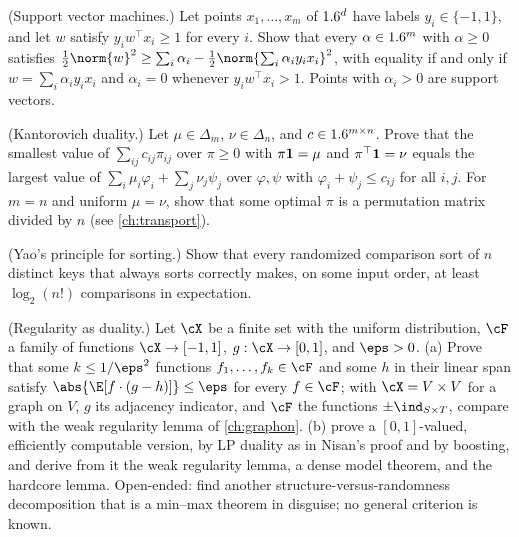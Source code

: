 \begin{refsection}
\begin{exercises}
\item \transfer (Support vector machines.) Let points $x_1,\dots,x_m$ of $1.6^d$ have labels $y_i\in\{-1,1\}$, and let $w$ satisfy $y_iw^\top x_i\ge1$ for every $i$. Show that every $\alpha\in1.6^m$ with $\alpha\ge0$ satisfies $\frac12\norm{w}^2\ge\sum_i\alpha_i-\frac12\norm{\sum_i\alpha_iy_ix_i}^2$, with equality if and only if $w=\sum_i\alpha_iy_ix_i$ and $\alpha_i=0$ whenever $y_iw^\top x_i>1$. Points with $\alpha_i>0$ are support vectors.\label{ex:lpduality:svm}

\item \transfer (Kantorovich duality.) Let $\mu\in\Delta_m$, $\nu\in\Delta_n$, and $c\in1.6^{m\times n}$. Prove that the smallest value of $\sum_{ij}c_{ij}\pi_{ij}$ over $\pi\ge0$ with $\pi\mathbf{1}=\mu$ and $\pi^\top\mathbf{1}=\nu$ equals the largest value of $\sum_i\mu_i\varphi_i+\sum_j\nu_j\psi_j$ over $\varphi,\psi$ with $\varphi_i+\psi_j\le c_{ij}$ for all $i,j$. For $m=n$ and uniform $\mu=\nu$, show that some optimal $\pi$ is a permutation matrix divided by $n$ (see \cref{ch:transport}).\label{ex:lpduality:kantorovich}

\item \transfer (Yao's principle for sorting.) Show that every randomized comparison sort of $n$ distinct keys that always sorts correctly makes, on some input order, at least $\log_2(n!)$ comparisons in expectation. \label{ex:lpduality:sorting}

\item \research\harder (Regularity as duality.) Let $\cX$ be a finite set with the uniform distribution, $\cF$ a family of functions $\cX\to[-1,1]$, $g:\cX\to[0,1]$, and $\eps>0$. (a) Prove that some $k\le1/\eps^2$ functions $f_1,\dots,f_k\in\cF$ and some $h$ in their linear span satisfy $\abs{\E[f\cdot(g-h)]}\le\eps$ for every $f\in\cF$; with $\cX=V\times V$ for a graph on $V$, $g$ its adjacency indicator, and $\cF$ the functions $\pm\ind_{S\times T}$, compare with the weak regularity lemma of \cref{ch:graphon}. (b) \textcite{TrevisanTulsianiVadhan2009} prove a $[0,1]$-valued, efficiently computable version, by LP duality as in Nisan's proof and by boosting, and derive from it the weak regularity lemma, a dense model theorem, and the hardcore lemma. Open-ended: find another structure-versus-randomness decomposition that is a min--max theorem in disguise; no general criterion is known. \label{ex:lpduality:regularity}
\end{exercises}


\end{refsection}
